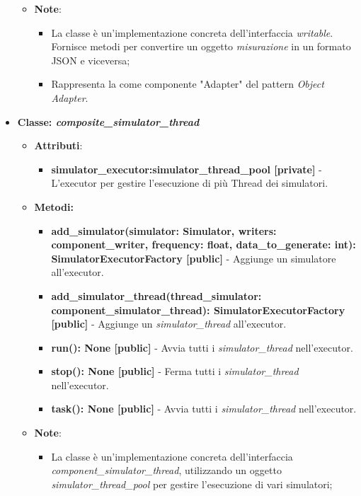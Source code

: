 \begin{itemize}
\begin{itemize}
\begin{itemize}
        \end{itemize}
        \item\textbf{Note}:
        \begin{itemize}
            \item La classe è un'implementazione concreta dell'interfaccia \textit{writable}. Fornisce metodi per convertire un oggetto \textit{misurazione} in un formato JSON e viceversa;
            \item Rappresenta la come componente "Adapter" del pattern \textit{Object Adapter}.
        \end{itemize}
    \end{itemize}
    \item{\textbf{Classe: \textit{composite\_simulator\_thread}}}
    \begin{itemize}
        \item\textbf{Attributi}:
        \begin{itemize}
            \item \textbf{simulator\_executor:simulator\_thread\_pool [private]} - L'executor per gestire l'esecuzione di più Thread dei simulatori.
        \end{itemize}
        \item \textbf{Metodi: }
        \begin{itemize}
            \item \textbf{add\_simulator(simulator: Simulator, writers: component\_writer, frequency: float, data\_to\_generate: int): SimulatorExecutorFactory [public]} - Aggiunge un simulatore all'executor.
            \item \textbf{add\_simulator\_thread(thread\_simulator: component\_simulator\_thread): SimulatorExecutorFactory [public]} - Aggiunge un \textit{simulator\_thread} all'executor.
            \item \textbf{run(): None [public]} - Avvia tutti i \textit{simulator\_thread} nell'executor.
            \item \textbf{stop(): None [public]} - Ferma tutti i \textit{simulator\_thread} nell'executor.
            \item \textbf{task(): None [public]} - Avvia tutti i \textit{simulator\_thread} nell'executor.
        \end{itemize}
        \item\textbf{Note}:
        \begin{itemize}
            \item La classe è un'implementazione concreta dell'interfaccia \textit{component\_simulator\_thread}, utilizzando un oggetto \textit{simulator\_thread\_pool} per gestire l'esecuzione di vari simulatori;

\end{itemize}
\end{itemize}
\end{itemize}
